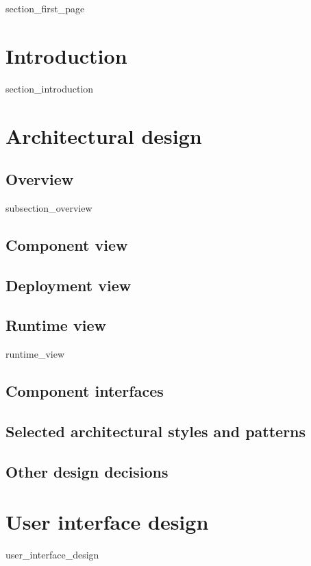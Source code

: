 \documentclass[a4paper]{article}
\begin{document}
{section_first_page}

\newpage
{}

\tableofcontents

\newpage
{}

\section{Introduction}\label{introduction}

{section_introduction}

\newpage

\section{Architectural design}\label{architectural_design}

\subsection{Overview}

{subsection_overview}

\subsection{Component view}
\subsection{Deployment view}

\newpage
\subsection{Runtime view}
{runtime_view}

\subsection{Component interfaces}
\subsection{Selected architectural styles and patterns}
\subsection{Other design decisions}

\newpage
\section{User interface design}
{user_interface_design}
\end{document}
